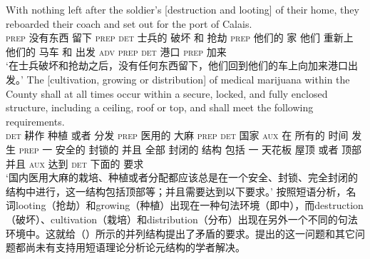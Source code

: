 \eal
\ex 
\gll With nothing left after the soldier's [destruction and looting] of their home, they reboarded their coach and set out for the port of Calais.\\
    \textsc{prep} 没有东西 留下 \textsc{prep} \textsc{det} 士兵的 \spacebr{}破坏 和 抢劫 \textsc{prep} 他们的 家 他们 重新上 他们的 马车 和 出发 \textsc{adv} \textsc{prep} \textsc{det} 港口 \textsc{prep} 加来\\
\glt `在士兵破坏和抢劫之后，没有任何东西留下，他们回到他们的车上向加来港口出发。' 
\ex  
\gll The [cultivation, growing or distribution] of medical marijuana within the County shall at all times occur within a secure, locked, and fully enclosed structure, including a ceiling, roof or top, and shall meet the following requirements.\\
    \textsc{det}  耕作 种植 或者 分发 \textsc{prep} 医用的 大麻 \textsc{prep} \textsc{det} 国家 \textsc{aux} 在 所有的 时间 发生 \textsc{prep} 一 安全的 封锁的 并且 全部 封闭的 结构 包括 一 天花板 屋顶 或者 顶部 并且 \textsc{aux} 达到 \textsc{det} 下面的 要求\\
\glt `国内医用大麻的栽培、种植或者分配都应该总是在一个安全、封锁、完全封闭的结构中进行，这一结构包括顶部等；并且需要达到以下要求。' 
\zl
    按照短语分析，名词looting（抢劫）和growing（种植）出现在一种句法环境（即\vPc 中），而destruction（破坏）、cultivation（栽培）和distribution（分布）出现在另外一个不同的句法环境中。这就给（）所示的并列结构提出了矛盾的要求。\citet{Wechsler2008a}提出的这一问题和其它问题都尚未有支持用短语理论分析论元结构的学者解决。
